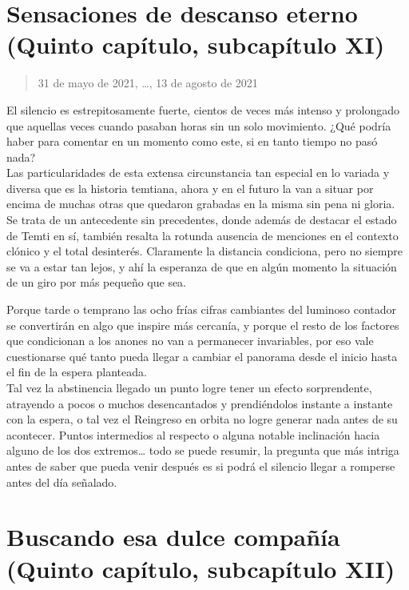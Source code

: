\documentclass[
  spanish,
]{book}
\begin{document}
\hypertarget{sensaciones-de-descanso-eterno-quinto-capuxedtulo-subcapuxedtulo-xi}{%
\section{Sensaciones de descanso eterno (Quinto capítulo, subcapítulo XI)}\label{sensaciones-de-descanso-eterno-quinto-capuxedtulo-subcapuxedtulo-xi}}

\begin{quote}
31 de mayo de 2021, \ldots, 13 de agosto de 2021
\end{quote}

El silencio es estrepitosamente fuerte, cientos de veces más intenso y prolongado que aquellas veces cuando pasaban horas sin un solo movimiento. ¿Qué podría haber para comentar en un momento como este, si en tanto tiempo no pasó nada?\\
Las particularidades de esta extensa circunstancia tan especial en lo variada y diversa que es la historia temtiana, ahora y en el futuro la van a situar por encima de muchas otras que quedaron grabadas en la misma sin pena ni gloria. Se trata de un antecedente sin precedentes, donde además de destacar el estado de Temti en sí, también resalta la rotunda ausencia de menciones en el contexto clónico y el total desinterés. Claramente la distancia condiciona, pero no siempre se va a estar tan lejos, y ahí la esperanza de que en algún momento la situación de un giro por más pequeño que sea.

Porque tarde o temprano las ocho frías cifras cambiantes del luminoso contador se convertirán en algo que inspire más cercanía, y porque el resto de los factores que condicionan a los anones no van a permanecer invariables, por eso vale cuestionarse qué tanto pueda llegar a cambiar el panorama desde el inicio hasta el fin de la espera planteada.\\
Tal vez la abstinencia llegado un punto logre tener un efecto sorprendente, atrayendo a pocos o muchos desencantados y prendiéndolos instante a instante con la espera, o tal vez el Reingreso en orbita no logre generar nada antes de su acontecer. Puntos intermedios al respecto o alguna notable inclinación hacia alguno de los dos extremos\ldots{} todo se puede resumir, la pregunta que más intriga antes de saber que pueda venir después es si podrá el silencio llegar a romperse antes del día señalado.

\hypertarget{buscando-esa-dulce-compauxf1uxeda-quinto-capuxedtulo-subcapuxedtulo-xii}{%
\section{Buscando esa dulce compañía (Quinto capítulo, subcapítulo XII)}\label{buscando-esa-dulce-compauxf1uxeda-quinto-capuxedtulo-subcapuxedtulo-xii}}
\end{document}
